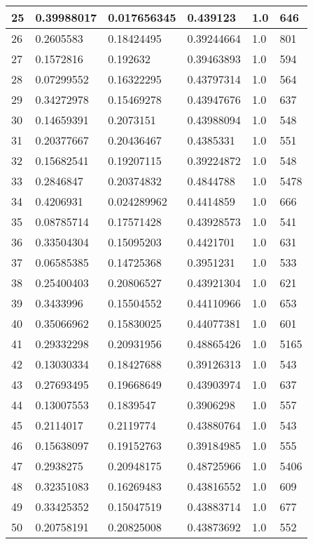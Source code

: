 \begin{longtable}{|l|l|l|l|l|l|}
25 & 0.39988017 & 0.017656345 & 0.439123 & 1.0 & 646 \\ \hline 
26 & 0.2605583 & 0.18424495 & 0.39244664 & 1.0 & 801 \\ \hline 
27 & 0.1572816 & 0.192632 & 0.39463893 & 1.0 & 594 \\ \hline 
28 & 0.07299552 & 0.16322295 & 0.43797314 & 1.0 & 564 \\ \hline 
29 & 0.34272978 & 0.15469278 & 0.43947676 & 1.0 & 637 \\ \hline 
30 & 0.14659391 & 0.2073151 & 0.43988094 & 1.0 & 548 \\ \hline 
31 & 0.20377667 & 0.20436467 & 0.4385331 & 1.0 & 551 \\ \hline 
32 & 0.15682541 & 0.19207115 & 0.39224872 & 1.0 & 548 \\ \hline 
33 & 0.2846847 & 0.20374832 & 0.4844788 & 1.0 & 5478 \\ \hline 
34 & 0.4206931 & 0.024289962 & 0.4414859 & 1.0 & 666 \\ \hline 
35 & 0.08785714 & 0.17571428 & 0.43928573 & 1.0 & 541 \\ \hline 
36 & 0.33504304 & 0.15095203 & 0.4421701 & 1.0 & 631 \\ \hline 
37 & 0.06585385 & 0.14725368 & 0.3951231 & 1.0 & 533 \\ \hline 
38 & 0.25400403 & 0.20806527 & 0.43921304 & 1.0 & 621 \\ \hline 
39 & 0.3433996 & 0.15504552 & 0.44110966 & 1.0 & 653 \\ \hline 
40 & 0.35066962 & 0.15830025 & 0.44077381 & 1.0 & 601 \\ \hline 
41 & 0.29332298 & 0.20931956 & 0.48865426 & 1.0 & 5165 \\ \hline 
42 & 0.13030334 & 0.18427688 & 0.39126313 & 1.0 & 543 \\ \hline 
43 & 0.27693495 & 0.19668649 & 0.43903974 & 1.0 & 637 \\ \hline 
44 & 0.13007553 & 0.1839547 & 0.3906298 & 1.0 & 557 \\ \hline 
45 & 0.2114017 & 0.2119774 & 0.43880764 & 1.0 & 543 \\ \hline 
46 & 0.15638097 & 0.19152763 & 0.39184985 & 1.0 & 555 \\ \hline 
47 & 0.2938275 & 0.20948175 & 0.48725966 & 1.0 & 5406 \\ \hline 
48 & 0.32351083 & 0.16269483 & 0.43816552 & 1.0 & 609 \\ \hline 
49 & 0.33425352 & 0.15047519 & 0.43883714 & 1.0 & 677 \\ \hline 
50 & 0.20758191 & 0.20825008 & 0.43873692 & 1.0 & 552 \\ \hline 
\end{longtable}